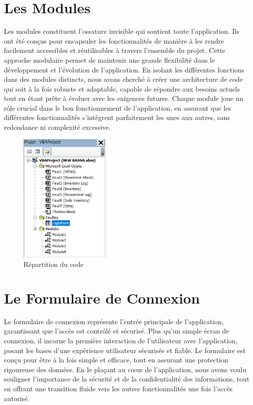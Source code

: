 \documentclass[a4paper, oneside, 12pt, final]{extreport}
\begin{document}
\section{Les Modules}
Les modules constituent l'ossature invisible qui soutient toute l'application. Ils ont été conçus pour encapsuler les fonctionnalités de manière à les rendre facilement accessibles et réutilisables à travers l'ensemble du projet. Cette approche modulaire permet de maintenir une grande flexibilité dans le développement et l'évolution de l'application. En isolant les différentes fonctions dans des modules distincts, nous avons cherché à créer une architecture de code qui soit à la fois robuste et adaptable, capable de répondre aux besoins actuels tout en étant prête à évoluer avec les exigences futures. Chaque module joue un rôle crucial dans le bon fonctionnement de l'application, en assurant que les différentes fonctionnalités s'intègrent parfaitement les unes aux autres, sans redondance ni complexité excessive.
\begin{figure}[h]
    \centering
    \includegraphics[width=0.4\textwidth]{Logic.png} %
    \caption{Répartition du code}
    \label{fig:Répartition du code}
\end{figure}

\section{Le Formulaire de Connexion}
Le formulaire de connexion représente l'entrée principale de l'application, garantissant que l'accès est contrôlé et sécurisé. Plus qu'un simple écran de connexion, il incarne la première interaction de l'utilisateur avec l'application, posant les bases d'une expérience utilisateur sécurisée et fiable. Le formulaire est conçu pour être à la fois simple et efficace, tout en assurant une protection rigoureuse des données. En le plaçant au cœur de l'application, nous avons voulu souligner l'importance de la sécurité et de la confidentialité des informations, tout en offrant une transition fluide vers les autres fonctionnalités une fois l'accès autorisé.
\end{document}
